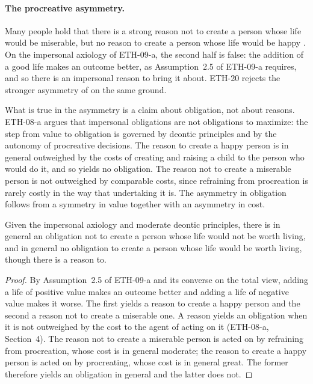 \documentclass{situationist-preprint}
\begin{document}
\paragraph{The procreative asymmetry.} Many people hold that there is a strong reason not to create a person whose life would be miserable, but no reason to create a person whose life would be happy \citep{Narveson1967}. On the impersonal axiology of ETH-09-a, the second half is false: the addition of a good life makes an outcome better, as Assumption~2.5 of ETH-09-a requires, and so there is an impersonal reason to bring it about. ETH-20 rejects the stronger asymmetry of \citet{Benatar2006} on the same ground.

What is true in the asymmetry is a claim about obligation, not about reasons. ETH-08-a argues that impersonal obligations are not obligations to maximize: the step from value to obligation is governed by deontic principles and by the autonomy of procreative decisions. The reason to create a happy person is in general outweighed by the costs of creating and raising a child to the person who would do it, and so yields no obligation. The reason not to create a miserable person is not outweighed by comparable costs, since refraining from procreation is rarely costly in the way that undertaking it is. The asymmetry in obligation follows from a symmetry in value together with an asymmetry in cost.

\begin{proposition}\label{p:asym}
Given the impersonal axiology and moderate deontic principles, there is in general an obligation not to create a person whose life would not be worth living, and in general no obligation to create a person whose life would be worth living, though there is a reason to.
\end{proposition}

\begin{proof}
By Assumption~2.5 of ETH-09-a and its converse on the total view, adding a life of positive value makes an outcome better and adding a life of negative value makes it worse. The first yields a reason to create a happy person and the second a reason not to create a miserable one. A reason yields an obligation when it is not outweighed by the cost to the agent of acting on it (ETH-08-a, Section~4). The reason not to create a miserable person is acted on by refraining from procreation, whose cost is in general moderate; the reason to create a happy person is acted on by procreating, whose cost is in general great. The former therefore yields an obligation in general and the latter does not.
\end{proof}
\end{document}
